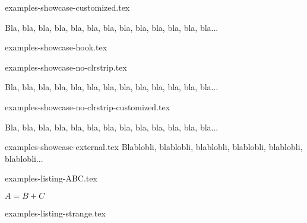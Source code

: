 \begin{filecontents*}[overwrite]{examples-showcase-customized.tex}
\begin{tdocshowcase}[before = Mon début,
                     after  = Ma fin à moi,
                     color  = red]
    Bla, bla, bla, bla, bla, bla, bla, bla, bla, bla, bla, bla, bla...
\end{tdocshowcase}
\end{filecontents*}


\begin{filecontents*}[overwrite]{examples-showcase-hook.tex}
\begin{tdocshowcase}
\end{tdocshowcase}
\end{filecontents*}


\begin{filecontents*}[overwrite]{examples-showcase-no-clrstrip.tex}
\begin{tdocshowcase}[nostripe]
    Bla, bla, bla, bla, bla, bla, bla, bla, bla, bla, bla, bla, bla...
\end{tdocshowcase}
\end{filecontents*}


\begin{filecontents*}[overwrite]{examples-showcase-no-clrstrip-customized.tex}
\begin{tdocshowcase}[nostripe,
                     before = Mon début,
                     after  = Ma fin à moi,
                     color  = green]
    Bla, bla, bla, bla, bla, bla, bla, bla, bla, bla, bla, bla, bla...
\end{tdocshowcase}
\end{filecontents*}


\begin{filecontents*}[overwrite]{examples-showcase-external.tex}
Blablobli, blablobli, blablobli, blablobli, blablobli, blablobli...
\end{filecontents*}


\begin{filecontents*}[overwrite]{examples-listing-ABC.tex}
\begin{tdoclatex}[sbs]
    $A = B + C$
\end{tdoclatex}
\end{filecontents*}


\begin{filecontents*}[overwrite]{examples-listing-strange.tex}
\begin{tdoclatex}
\end{tdoclatex}
\end{filecontents*}



